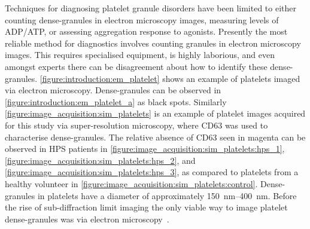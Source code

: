 Techniques for diagnosing platelet granule disorders have been limited to either counting dense-granules in electron microscopy images, measuring levels of ADP/ATP, or assessing aggregation response to agonists. Presently the most reliable method for diagnostics involves counting granules in electron microscopy images. This requires specialised equipment, is highly laborious, and even amongst experts there can be disagreement about how to identify these dense-granules. \autoref{figure:introduction:em_platelet} shows an example of platelets imaged via electron microscopy. Dense-granules can be observed in \autoref{figure:introduction:em_platelet_a} as black spots. Similarly \autoref{figure:image_acquisition:sim_platelets} is an example of platelet images acquired for this study via super-resolution microscopy, where CD63 was used to characterise dense-granules. The relative absence of CD63 seen in magenta can be observed in HPS patients in \autoref{figure:image_acquisition:sim_platelets:hps_1}, \autoref{figure:image_acquisition:sim_platelets:hps_2}, and \autoref{figure:image_acquisition:sim_platelets:hps_3}, as compared to platelets from a healthy volunteer in \autoref{figure:image_acquisition:sim_platelets:control}. Dense-granules in platelets have a diameter of approximately \SIrange{150}{400}{\nano\meter}. Before the rise of sub-diffraction limit imaging the only viable way to image platelet dense-granules was via electron microscopy~\cite{Rumbaut2010}.

